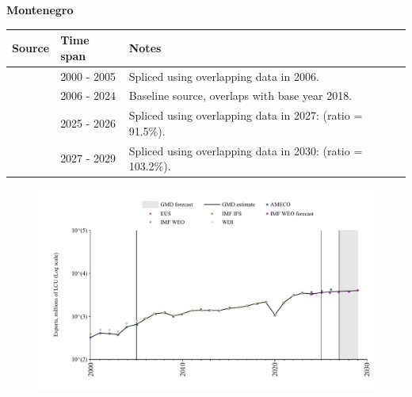 \documentclass[12pt,a4paper,landscape]{article}
\begin{document}
\begin{adjustbox}{max totalsize={\paperwidth}{\paperheight},center}
\begin{minipage}[t][\textheight][t]{\textwidth}
\vspace*{0.5cm}
{}
\begin{center}
{\Large\bfseries Montenegro}
\end{center}
\vspace{0.5cm}
\begin{table}[H]
\centering
\small
\begin{tabular}{|l|l|l|}
\hline
\textbf{Source} & \textbf{Time span} & \textbf{Notes} \\
\hline
\rowcolor{white}\cite{AMECO}& 2000 - 2005 &Spliced using overlapping data in 2006.\\
\rowcolor{lightgray}\cite{EUS}& 2006 - 2024 &Baseline source, overlaps with base year 2018.\\
\rowcolor{white}\cite{AMECO}& 2025 - 2026 &Spliced using overlapping data in 2027: (ratio = 91.5\%).\\
\rowcolor{lightgray}\cite{IMF_WEO_forecast}& 2027 - 2029 &Spliced using overlapping data in 2030: (ratio = 103.2\%).\\
\hline
\end{tabular}
\end{table}
\begin{figure}[H]
\centering
\includegraphics[width=\textwidth,height=0.6\textheight,keepaspectratio]{graphs/MNE_exports.pdf}
\end{figure}
\end{minipage}
\end{adjustbox}
\end{document}
